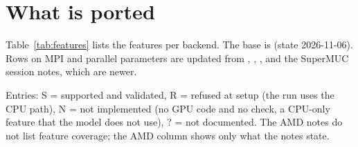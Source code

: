\section{What is ported}
\label{sec:ported}

Table~\ref{tab:features} lists the features per backend. The base is  (state 2026-11-06). Rows on MPI and parallel parameters are updated from , , ,  and the SuperMUC session notes, which are newer. 

Entries: S = supported and validated, R = refused at setup (the run uses the CPU path), N = not implemented (no GPU code and no check, a CPU-only feature that the model does not use), ? = not documented. The AMD notes do not list feature coverage; the AMD column shows only what the notes state. 

